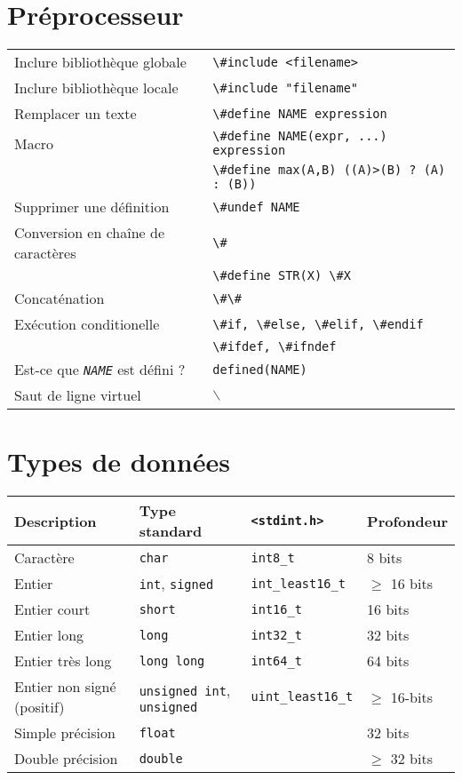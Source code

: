 \documentclass{article}
\newcommand{\bs}{$\backslash$}
\newcommand{\NAME}{\emph{NAME}}
\newcommand{\cd}{\lstinline}
\begin{document}
\begin{multicols*}{3}
\section*{Préprocesseur}

\begin{tabularx}{\linewidth}{Xl}
  Inclure bibliothèque globale       & \cd{\#include <filename>} \\
  Inclure bibliothèque locale        & \cd{\#include "filename"} \\
  Remplacer un texte                 & \cd{\#define NAME expression} \\
  Macro                              & \cd{\#define NAME(expr, ...) expression} \\
                                     & \cd{\#define max(A,B) ((A)>(B) ? (A) : (B))} \\
  Supprimer une définition           & \cd{\#undef NAME} \\
  Conversion en chaîne de caractères & \cd{\#} \\
                                     & \cd{\#define STR(X) \#X} \\
  Concaténation                      & \cd{\#\#} \\
  Exécution conditionelle            & \cd{\#if, \#else, \#elif, \#endif} \\
                                     & \cd{\#ifdef, \#ifndef} \\
  Est-ce que \texttt{\NAME} est défini ? & \cd{defined(NAME)} \\
  Saut de ligne virtuel              & \bs
\end{tabularx}

\section*{Types de données}

  \begin{tabularx}{\linewidth}{Xlll}
    \bf Description & \bf Type standard & \bf \texttt{<stdint.h>} & \bf Profondeur \\
    \hline
    Caractère                   & \cd{char}      & \cd {int8_t} & 8 bits \\
    \hline
    Entier                      & \cd{int}, \cd{signed}  & \cd {int_least16_t} & $\geq$ 16 bits \\
    Entier court                & \cd{short}     & \cd {int16_t} & 16 bits \\
    Entier long                 & \cd{long}      & \cd {int32_t} & 32 bits \\
    Entier très long            & \cd{long long} & \cd {int64_t} & 64 bits \\
    Entier non signé (positif)  & \cd{unsigned int}, \cd{unsigned} & \cd{uint_least16_t} & $\geq$ 16-bits \\
    \hline
    Simple précision            & \cd{float}     &  & 32 bits \\
    Double précision            & \cd{double}    &  & $\geq$ 32 bits \\
  \end{tabularx}


\end{multicols*}
\end{document}

